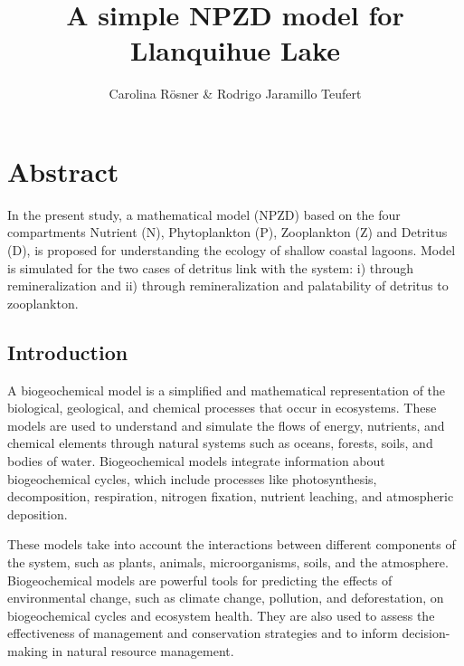 \documentclass[
  letterpaper,
  DIV=11,
  numbers=noendperiod]{scrartcl}
\title{A simple NPZD model for Llanquihue Lake}
\author{Carolina Rösner \& Rodrigo Jaramillo Teufert}
\date{}
\begin{document}
\maketitle
\ifdefined\Shaded\renewenvironment{Shaded}{\begin{tcolorbox}[breakable, sharp corners, boxrule=0pt, frame hidden, enhanced, interior hidden, borderline west={3pt}{0pt}{shadecolor}]}{\end{tcolorbox}}\fi

\hypertarget{abstract}{%
\section{Abstract}\label{abstract}}

In the present study, a mathematical model (NPZD) based on the four
compartments Nutrient (N), Phytoplankton (P), Zooplankton (Z) and
Detritus (D), is proposed for understanding the ecology of shallow
coastal lagoons. Model is simulated for the two cases of detritus link
with the system: i) through remineralization and ii) through
remineralization and palatability of detritus to zooplankton.

\hypertarget{introduction}{%
\subsection{Introduction}\label{introduction}}

A biogeochemical model is a simplified and mathematical representation
of the biological, geological, and chemical processes that occur in
ecosystems. These models are used to understand and simulate the flows
of energy, nutrients, and chemical elements through natural systems such
as oceans, forests, soils, and bodies of water. Biogeochemical models
integrate information about biogeochemical cycles, which include
processes like photosynthesis, decomposition, respiration, nitrogen
fixation, nutrient leaching, and atmospheric deposition.

These models take into account the interactions between different
components of the system, such as plants, animals, microorganisms,
soils, and the atmosphere. Biogeochemical models are powerful tools for
predicting the effects of environmental change, such as climate change,
pollution, and deforestation, on biogeochemical cycles and ecosystem
health. They are also used to assess the effectiveness of management and
conservation strategies and to inform decision-making in natural
resource management.
\end{document}
